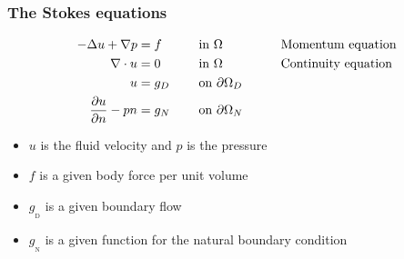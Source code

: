 \begin{frame}
  \frametitle{The Stokes equations}
  \begin{alignat*}{3}
    -\Delta u + \nabla p &= f    &&\quad \text{in } \Omega &&\qquad \text{Momentum equation}\\
          \nabla \cdot u &= 0 \quad &&\quad \text{in } \Omega &&\qquad
    \text{Continuity equation}\\
                       u &= g_D  &&\quad \text{on } \partial \Omega_D && \\
    \dfrac{\partial u}{\partial n} -p n &=  g_N &&\quad \text{on } \partial \Omega_N&
  \end{alignat*}
  \linespread{1.0}
  \begin{itemize}
    \item
      $u$ is the fluid velocity and $p$ is the pressure
    \item
      $f$ is a given body force per unit volume
    \item
      $g_{_\mathrm{D}}$ is a given boundary flow
    \item
      $g_{_\mathrm{N}}$ is a given function for the natural boundary condition
  \end{itemize}
\end{frame}

%

